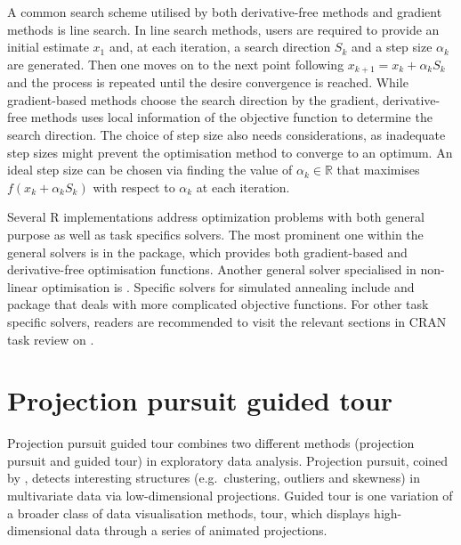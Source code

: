 A common search scheme utilised by both derivative-free methods and
gradient methods is line search. In line search methods, users are
required to provide an initial estimate \(x_{1}\) and, at each
iteration, a search direction \(S_k\) and a step size \(\alpha_k\) are
generated. Then one moves on to the next point following
\(x_{k+1} = x_k + \alpha_kS_k\) and the process is repeated until the
desire convergence is reached. While gradient-based methods choose the
search direction by the gradient, derivative-free methods uses local
information of the objective function to determine the search direction.
The choice of step size also needs considerations, as inadequate step
sizes might prevent the optimisation method to converge to an optimum.
An ideal step size can be chosen via finding the value of
\(\alpha_k \in \mathbb{R}\) that maximises \(f(x_k + \alpha_kS_k)\) with
respect to \(\alpha_k\) at each iteration.

Several R implementations address optimization problems with both
general purpose as well as task specifics solvers. The most prominent
one within the general solvers is  in the 
\citep{stats} package, which provides both gradient-based and
derivative-free optimisation functions. Another general solver
specialised in non-linear optimisation is 
\citep{nloptr}. Specific solvers for simulated annealing include
 and package 
\citep{gensa} that deals with more complicated objective functions. For
other task specific solvers, readers are recommended to visit the
relevant sections in CRAN task review on
\citep{crantaskreviewoptim}.

\hypertarget{tour}{%
\section{Projection pursuit guided tour}\label{tour}}

Projection pursuit guided tour combines two different methods
(projection pursuit and guided tour) in exploratory data analysis.
Projection pursuit, coined by \citet{friedman1974projection}, detects
interesting structures (e.g.~clustering, outliers and skewness) in
multivariate data via low-dimensional projections. Guided tour is one
variation of a broader class of data visualisation methods, tour, which
displays high-dimensional data through a series of animated projections.

